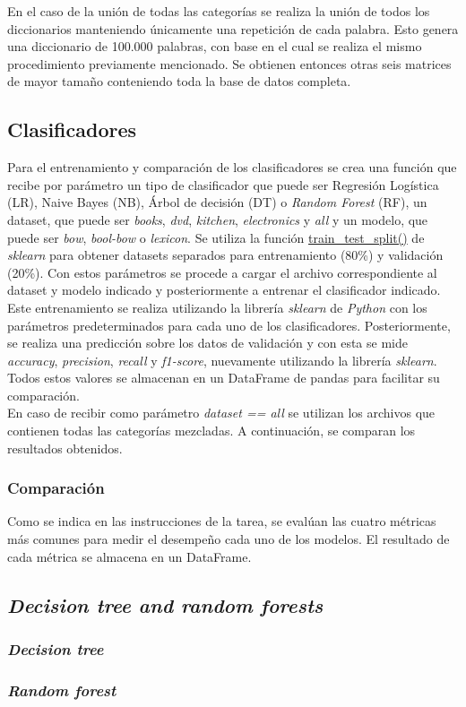 En el caso de la unión de todas las categorías se realiza la unión de todos los diccionarios manteniendo únicamente una repetición de cada palabra. Esto genera una diccionario de 100.000 palabras, con base en el cual se realiza el mismo procedimiento previamente mencionado. Se obtienen entonces otras seis matrices de mayor tamaño conteniendo toda la base de datos completa.

\subsection{Clasificadores}
Para el entrenamiento y comparación de los clasificadores se crea una función que recibe por parámetro un tipo de clasificador que puede ser Regresión Logística (LR), Naive Bayes (NB), Árbol de decisión (DT) o \textit{Random Forest} (RF), un dataset, que puede ser \textit{books}, \textit{dvd}, \textit{kitchen}, \textit{electronics} y \textit{all} y un modelo, que puede ser \textit{bow}, \textit{bool-bow} o \textit{lexicon}. Se utiliza la función \url{train\_test\_split()} de \textit{sklearn}  para obtener datasets separados para entrenamiento (80\%) y validación (20\%). Con estos parámetros se procede a cargar el archivo correspondiente al dataset y modelo indicado y posteriormente a entrenar el clasificador indicado.\\

Este entrenamiento se realiza utilizando la librería \textit{sklearn} de \textit{Python} con los parámetros predeterminados para cada uno de los clasificadores. Posteriormente, se realiza una predicción sobre los datos de validación y con esta se mide \textit{accuracy}, \textit{precision}, \textit{recall} y \textit{f1-score}, nuevamente utilizando la librería \textit{sklearn}. Todos estos valores se almacenan en un DataFrame de pandas para facilitar su comparación.\\

En caso de recibir como parámetro \textit{dataset == all} se utilizan los archivos que contienen todas las categorías mezcladas. A continuación, se comparan los resultados obtenidos.

\subsubsection{Comparación}
Como se indica en las instrucciones de la tarea, se evalúan las cuatro métricas más comunes para medir el desempeño cada uno de los modelos. El resultado de cada métrica se almacena en un DataFrame.



\subsection{\textit{Decision tree and random forests}}
\subsubsection{\textit{Decision tree}}
\subsubsection{\textit{Random forest}}